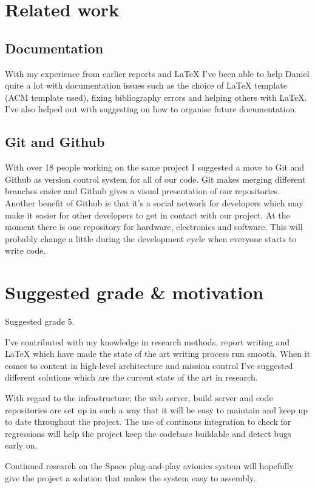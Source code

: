 \section{Related work}
\subsection{Documentation}
With my experience from earlier reports and LaTeX I've been able to help Daniel
quite a lot with documentation issues such as the choice of LaTeX template
(ACM template used), fixing bibliography errors and helping
others with LaTeX. I've also helped out with suggesting on how to organise
future documentation.

\subsection{Git and Github}
With over 18 people working on the same project I suggested a move to Git and
Github as version control system for all of our code. Git makes merging
different branches easier and Github gives a visual presentation of our
repositories. Another benefit of Github is that it's a social network for
developers which may make it easier for other developers to get in contact
with our project. At the moment there is one repository for hardware, electronics
and software. This will probably change a little during the development cycle
when everyone starts to write code.

\section{Suggested grade \& motivation}
Suggested grade 5.

I've contributed with my knowledge in research methods, report writing and LaTeX
which have made the state of the art writing process run smooth. When it comes to
content in high-level architecture and mission control I've suggested
different solutions which are the current state of the art in research.

With regard to the infrastructure; the web server, build server and code repositories
are set up in such a way that it will be easy to maintain and keep up to date
throughout the project. The use of continous integration to check for regressions
will help the project keep the codebase buildable and detect bugs early on.

Continued research on the Space plug-and-play avionics system will hopefully give
the project a solution that makes the system easy to assembly.

